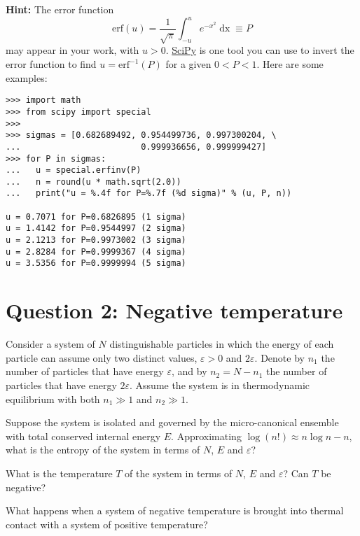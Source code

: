 \documentclass[12 pt]{article} %
\newcommand{\eps}{\ensuremath{\varepsilon} }
\renewcommand{\d}[1]{\ensuremath{\mathop{d#1}} }
\newcommand{\showmarks}[1]{\rightline{\texttt{[#1 marks]}}} %
\begin{document}
\vfill
\textbf{Hint:} The error function
\begin{equation*}
  \mathrm{erf}(u) = \frac{1}{\sqrt{\pi}} \int_{-u}^u e^{-x^2} \d{x} \equiv P
\end{equation*}
may appear in your work, with $u > 0$.
\href{https://scipy.org}{SciPy} is one tool you can use to invert the error function to find $u = \mathrm{erf}^{-1}(P)$ for a given $0 < P < 1$.
Here are some examples: \\[-30 pt]
\begin{verbatim}
>>> import math
>>> from scipy import special
>>>
>>> sigmas = [0.682689492, 0.954499736, 0.997300204, \
...                        0.999936656, 0.999999427]
>>> for P in sigmas:
...   u = special.erfinv(P)
...   n = round(u * math.sqrt(2.0))
...   print("u = %.4f for P=%.7f (%d sigma)" % (u, P, n))

u = 0.7071 for P=0.6826895 (1 sigma)
u = 1.4142 for P=0.9544997 (2 sigma)
u = 2.1213 for P=0.9973002 (3 sigma)
u = 2.8284 for P=0.9999367 (4 sigma)
u = 3.5356 for P=0.9999994 (5 sigma)
\end{verbatim}



\newpage
\section*{Question 2: Negative temperature}
Consider a system of $N$ distinguishable particles in which the energy of each particle can assume only two distinct values, $\eps > 0$ and $2\eps$.
Denote by $n_1$ the number of particles that have energy $\eps$, and by $n_2 = N - n_1$ the number of particles that have energy $2\eps$.
Assume the system is in thermodynamic equilibrium with both $n_1 \gg 1$ and $n_2 \gg 1$.

Suppose the system is isolated and governed by the micro-canonical ensemble with total conserved internal energy $E$.
Approximating $\log(n!) \approx n\log n - n$, what is the entropy of the system in terms of $N$, $E$ and $\eps$?

\showmarks{10}

What is the temperature $T$ of the system in terms of $N$, $E$ and $\eps$?
Can $T$ be negative?

\showmarks{10}

What happens when a system of negative temperature is brought into thermal contact with a system of positive temperature?
\end{document}
